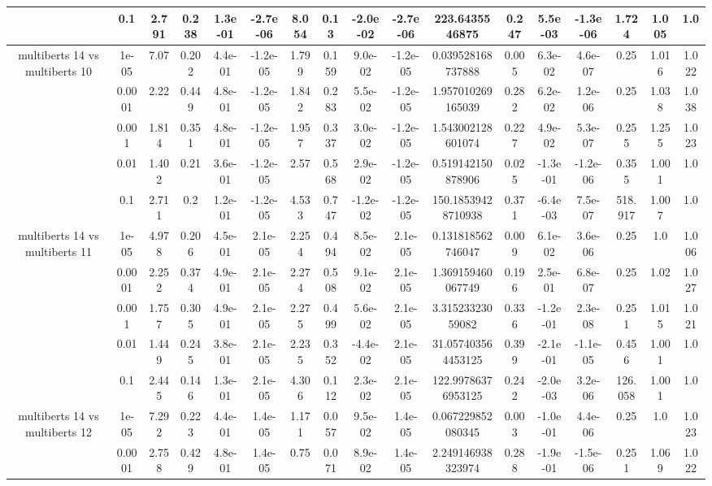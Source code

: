 \begin{tabular}{|c|c|c|c|c|c|c|c|c|c|c|c|c|c|c|c|c|}
 & 0.1 & 2.791 & 0.238 & 1.3e-01 & -2.7e-06 & 8.054 & 0.13 & -2.0e-02 & -2.7e-06 & 223.6435546875 & 0.247 & 5.5e-03 & -1.3e-06 & 1.724 & 1.005 & 1.0 \\
\hline
\multirow{5}{*}{multiberts 14 vs multiberts 10} & 1e-05 & 7.07 & 0.202 & 4.4e-01 & -1.2e-05 & 1.799 & 0.159 & 9.0e-02 & -1.2e-05 & 0.039528168737888 & 0.005 & 6.3e-02 & 4.6e-07 & 0.25 & 1.016 & 1.022 \\
 & 0.0001 & 2.22 & 0.449 & 4.8e-01 & -1.2e-05 & 1.842 & 0.283 & 5.5e-02 & -1.2e-05 & 1.957010269165039 & 0.282 & 6.2e-02 & 1.2e-06 & 0.25 & 1.038 & 1.038 \\
 & 0.001 & 1.814 & 0.351 & 4.8e-01 & -1.2e-05 & 1.957 & 0.337 & 3.0e-02 & -1.2e-05 & 1.543002128601074 & 0.227 & 4.9e-02 & 5.3e-07 & 0.255 & 1.255 & 1.023 \\
 & 0.01 & 1.402 & 0.21 & 3.6e-01 & -1.2e-05 & 2.57 & 0.568 & 2.9e-02 & -1.2e-05 & 0.519142150878906 & 0.025 & -1.3e-01 & -1.2e-06 & 0.355 & 1.001 & 1.0 \\
 & 0.1 & 2.711 & 0.2 & 1.2e-01 & -1.2e-05 & 4.533 & 0.747 & -1.2e-02 & -1.2e-05 & 150.18539428710938 & 0.371 & -6.4e-03 & 7.5e-07 & 518.917 & 1.007 & 1.0 \\
\hline
\multirow{5}{*}{multiberts 14 vs multiberts 11} & 1e-05 & 4.978 & 0.206 & 4.5e-01 & 2.1e-05 & 2.254 & 0.494 & 8.5e-02 & 2.1e-05 & 0.131818562746047 & 0.009 & 6.1e-02 & 3.6e-06 & 0.25 & 1.0 & 1.006 \\
 & 0.0001 & 2.252 & 0.374 & 4.9e-01 & 2.1e-05 & 2.274 & 0.508 & 9.1e-02 & 2.1e-05 & 1.369159460067749 & 0.196 & 2.5e-01 & 6.8e-07 & 0.25 & 1.02 & 1.027 \\
 & 0.001 & 1.757 & 0.305 & 4.9e-01 & 2.1e-05 & 2.275 & 0.499 & 5.6e-02 & 2.1e-05 & 3.31523323059082 & 0.336 & -1.2e-01 & 2.3e-08 & 0.251 & 1.015 & 1.021 \\
 & 0.01 & 1.449 & 0.245 & 3.8e-01 & 2.1e-05 & 2.235 & 0.352 & -4.4e-02 & 2.1e-05 & 31.057403564453125 & 0.399 & -2.1e-01 & -1.1e-05 & 0.456 & 1.001 & 1.0 \\
 & 0.1 & 2.445 & 0.146 & 1.3e-01 & 2.1e-05 & 4.306 & 0.112 & 2.3e-02 & 2.1e-05 & 122.99786376953125 & 0.242 & -2.0e-03 & 3.2e-06 & 126.058 & 1.001 & 1.0 \\
\hline
\multirow{5}{*}{multiberts 14 vs multiberts 12} & 1e-05 & 7.292 & 0.223 & 4.4e-01 & 1.4e-05 & 1.171 & 0.057 & 9.5e-02 & 1.4e-05 & 0.067229852080345 & 0.003 & -1.0e-01 & 4.4e-06 & 0.25 & 1.0 & 1.023 \\
 & 0.0001 & 2.758 & 0.429 & 4.8e-01 & 1.4e-05 & 0.75 & 0.071 & 8.9e-02 & 1.4e-05 & 2.249146938323974 & 0.288 & -1.9e-01 & -1.5e-06 & 0.251 & 1.069 & 1.022 \\

\end{tabular}
